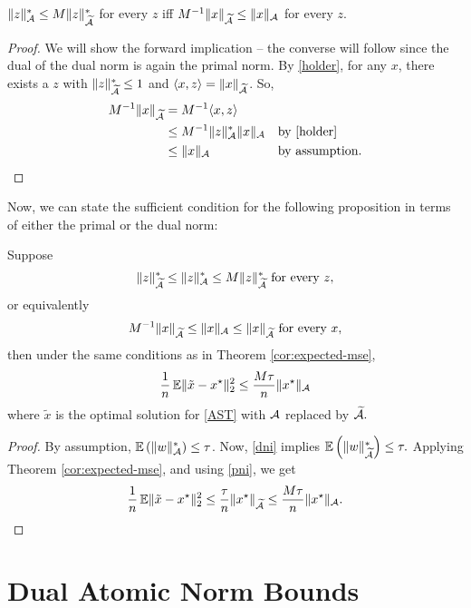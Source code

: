 \begin{lemma}
${\lVert z\rVert_{\mathcal{A}}^* \leq M\lVert z\rVert_{\widetilde{\mathcal{A}}}^*}$ for every $z$ iff
${M^{-1}\lVert x\rVert_{\widetilde{\mathcal{A}}} \leq \lVert x\rVert_{\mathcal{A}}}$ for every $z$.
\end{lemma}
\begin{proof}\belowdisplayskip=-12pt
We will show the forward implication -- the converse will follow since the dual
of the dual norm is again the primal norm. By \eqref{holder}, for any $x$, 
there exists a $z$ with
$\lVert z\rVert_{\widetilde{\mathcal{A}}}^* \leq 1$ and ${\langle x, z\rangle =
\lVert x\rVert_{\widetilde{\mathcal{A}}}}$. So,
\begin{align*}
M^{-1}\lVert x\rVert_{\widetilde{\mathcal{A}}} &= M^{-1}\langle x, z\rangle &&\\
&\leq M^{-1}\lVert z\rVert_{\mathcal{A}}^* \lVert x\rVert_{\mathcal{A}} &&\text{by \eqref{holder}}\\
&\leq \lVert x\rVert_{\mathcal{A}} &&\text{by assumption.}
\end{align*}
\end{proof}
Now, we can state the sufficient condition for the following proposition in
terms of either the primal or the dual norm:
\begin{prop}\label{prop:grid-approx-mse}
Suppose 
\begin{equation}
  \label{dni}
  \lVert z\rVert_{\widetilde{\mathcal{A}}}^* \leq \lVert z\rVert_{\mathcal{A}}^* \leq 
  M\lVert z\rVert_{\widetilde{\mathcal{A}}}^* \text{ for every } z,
\end{equation}
or equivalently 
\begin{equation}
  \label{pni}
  M^{-1}\lVert x\rVert_{\widetilde{\mathcal{A}}} \leq \lVert x\rVert_{\mathcal{A}} \leq \lVert x\rVert_{\widetilde{\mathcal{A}}} \text{ for every } x,
\end{equation}
then under the same conditions as in Theorem \ref{cor:expected-mse},
\begin{equation*}
    \frac{1}{n} \operatorname{\mathbb{E}} \lVert\tilde{x} - x^\star\rVert_2^2 \leq \frac{M \tau}{n}\lVert x^\star\rVert_{\mathcal{A}}
\end{equation*}
where $\tilde{x}$ is the optimal solution for \eqref{AST} with $\mathcal{A}$ replaced by $\widetilde{\mathcal{A}}.$
\end{prop}
\begin{proof}\belowdisplayskip=-12pt
By assumption, $\operatorname{\mathbb{E}}\left(\lVert w\rVert_{\mathcal{A}}^*\right) \leq \tau$. Now, \eqref{dni}
implies $\operatorname{\mathbb{E}}\left(\lVert w\rVert_{\widetilde{\mathcal{A}}}^*\right) \leq \tau.$ Applying
Theorem \ref{cor:expected-mse}, and using \eqref{pni}, we get
\begin{equation*}
\frac{1}{n} \operatorname{\mathbb{E}} \lVert\tilde{x} - x^\star\rVert_2^2 \leq \frac{\tau}{n}\lVert x^\star\rVert_{\widetilde{\mathcal{A}}} \leq \frac{M \tau}{n}\lVert x^\star\rVert_{\mathcal{A}}.
\end{equation*}
\end{proof}

\section{Dual Atomic Norm Bounds}
